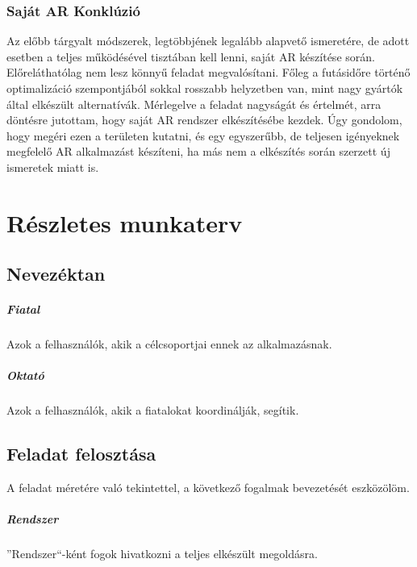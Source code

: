 \documentclass[12pt,a4paper,oneside]{report} %
\begin{document}
\subsection{Saját AR Konklúzió}
Az előbb tárgyalt módszerek, legtöbbjének legalább alapvető ismeretére, de adott esetben a teljes  működésével tisztában kell lenni, saját AR készítése során. Előreláthatólag nem lesz könnyű feladat megvalósítani. Főleg a futásidőre történő optimalizáció szempontjából sokkal rosszabb helyzetben van, mint nagy gyártók által elkészült alternatívák. Mérlegelve a feladat nagyságát és értelmét, arra döntésre jutottam, hogy saját AR rendszer elkészítésébe kezdek. Úgy gondolom, hogy megéri ezen a területen kutatni, és egy egyszerűbb, de teljesen igényeknek megfelelő AR alkalmazást készíteni, ha más nem a elkészítés során szerzett új ismeretek miatt is.

\chapter{Részletes munkaterv}
\label{munakterv}
\section{Nevezéktan}
\paragraph{Fiatal} Azok a felhasználók, akik a célcsoportjai ennek az alkalmazásnak.
\paragraph{Oktató} Azok a felhasználók, akik a fiatalokat koordinálják, segítik.

\section{Feladat felosztása}
A feladat méretére való tekintettel, a következő fogalmak bevezetését eszközölöm.
\paragraph{Rendszer}
''Rendszer``-ként fogok hivatkozni a teljes elkészült megoldásra.
\end{document}
